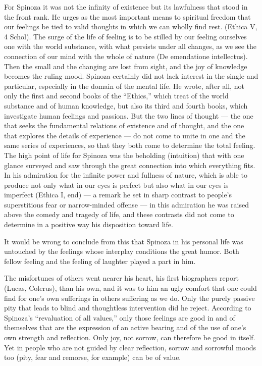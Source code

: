 \documentclass[12pt]{book}
\newcommand{\opage}[1]{\marginnote{\footnotesize\textit{[#1]}}}
\begin{document}
For Spinoza it was not the infinity of existence but its lawfulness that stood in the front rank.
He urges as the most important means to spiritual freedom that our feelings be tied to valid
thoughts in which we can wholly find rest. (Ethica V, 4 Schol). The surge of the life of feeling is
to be stilled by our feeling ourselves one with the world substance, with what persists under all
changes, as we see the connection of our mind with the whole of nature (De emendatione
intellectus). Then the small and the changing are lost from sight, and the joy of knowledge becomes
the ruling mood. Spinoza certainly did not lack interest in the single and particular, especially
in the domain of the mental life. He wrote, after all, not only the first and second books of the
``Ethics,'' which treat of the world substance and of human knowledge, but also its third and fourth
books, which investigate human feelings and passions. But the two lines of thought --- the one that
seeks the fundamental relations of existence and of thought, and the one that explores the details
of experience --- do not come to unite in one and the same series of experiences, so that they both
come to determine the total feeling. The high point of life for Spinoza was the beholding
(intuition) that with one glance surveyed and saw through the great connection into which everything
fits. In his admiration for the infinite power and fullness of nature, which is able
\opage{156}to produce not only what in our eyes is perfect but also what in our eyes is imperfect
(Ethica I, end) --- a remark he set in sharp contrast to people's superstitious fear or narrow-minded
offense --- in this admiration he was raised above the comedy and tragedy of life, and these
contrasts did not come to determine in a positive way his disposition toward life.

It would be wrong to conclude from this that Spinoza in his personal life was untouched by the
feelings whose interplay conditions the great humor. Both fellow feeling and the feeling of laughter
played a part in him.

The misfortunes of others went nearer his heart, his first biographers report (Lucas, Colerus), than
his own, and it was to him an ugly comfort that one could find for one's own sufferings in others
suffering as we do. Only the purely passive pity that leads to blind and thoughtless intervention
did he reject. According to Spinoza's ``revaluation of all values,'' only those feelings are good in
and of themselves that are the expression of an active bearing and of the use of one's own strength
and reflection. Only joy, not sorrow, can therefore be good in itself. Yet in people who are not
guided by clear reflection, sorrow and sorrowful moods too (pity, fear and remorse, for example) can
be of value.
\end{document}
